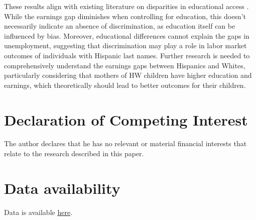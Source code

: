 \documentclass[a4paper,fleqn]{cas-sc}
\begin{document}
These results align with existing literature on disparities in educational access \citep{bergman2018education,gaddis2024racial}. While the earnings gap diminishes when controlling for education, this doesn't necessarily indicate an absence of discrimination, as education itself can be influenced by bias. Moreover, educational differences cannot explain the gaps in unemployment, suggesting that discrimination may play a role in labor market outcomes of individuals with Hispanic last names. Further research is needed to comprehensively understand the earnings gaps between Hispanics and Whites, particularly considering that mothers of HW children have higher education and earnings, which theoretically should lead to better outcomes for their children.


\section*{Declaration of Competing Interest}
The author declares that he has no relevant or material financial interests that relate to the research described in this paper.

\section*{Data availability}

Data is available \href{https://github.com/hhadah/hispanic-last-names/tree/main/data/datasets}{here}.

\newpage
\clearpage



\newpage
\clearpage


\newpage
\clearpage



\newpage
\clearpage



\newpage
\clearpage


\end{document}
